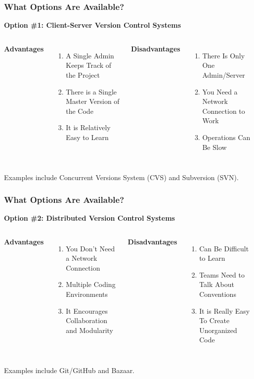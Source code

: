 \begin{frame}
\frametitle{\large{What Options Are Available?}}
\textbf{Option \#1: Client-Server Version Control Systems}
\vspace{8mm}
\begin{columns}[c]
\column{2in}
{\small \textbf{Advantages}}
\begin{enumerate}
\small 
\item A Single Admin Keeps Track of the Project
\item There is a Single Master Version of the Code
\item It is Relatively Easy to Learn
\end{enumerate}
\column{2in}
{\small \textbf{Disadvantages} }
\begin{enumerate}
\small
\item There Is Only One Admin/Server
\item You Need a Network Connection to Work
\item Operations Can Be Slow
\end{enumerate}
\end{columns}
\vspace{5mm}
{\small Examples include Concurrent Versions System (CVS) and Subversion (SVN).}
\end{frame}

\begin{frame}
\frametitle{\large{What Options Are Available?}}
\textbf{Option \#2: Distributed Version Control Systems}
\vspace{8mm}
\begin{columns}[c]
\column{2in}
{\small \textbf{Advantages}}
\begin{enumerate}
\small
\item You Don't Need a Network Connection
\item Multiple Coding Environments
\item It Encourages Collaboration and Modularity
\end{enumerate}
\column{2in}
{\small \textbf{Disadvantages}}
\begin{enumerate}
\small
\item Can Be Difficult to Learn
\item Teams Need to Talk About Conventions
\item It is Really Easy To Create Unorganized Code 
\end{enumerate}
\end{columns}
\vspace{5mm}
{\small Examples include Git/GitHub and Bazaar.}
\end{frame}

